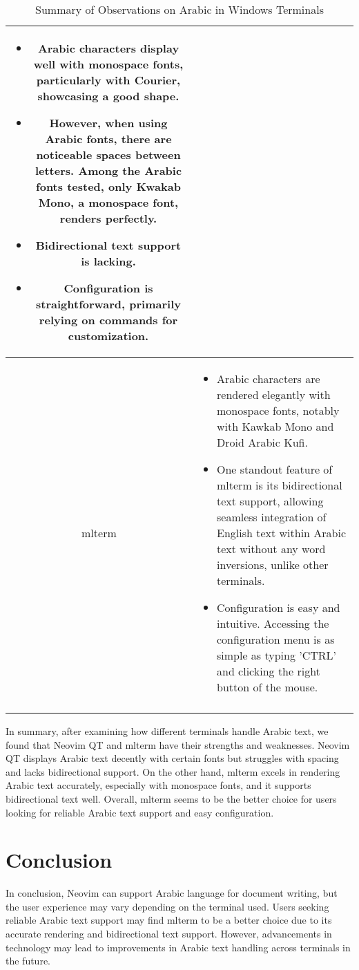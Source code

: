 \documentclass[12pt, letterpaper]{article}
\begin{document}
\begin{longtable}{|c|p{10cm}|}
    \begin{itemize}
        \item Arabic characters display well with monospace fonts, particularly with Courier, showcasing a good shape.
        \item However, when using Arabic fonts, there are noticeable spaces between letters. Among the Arabic fonts tested, only Kwakab Mono, a monospace font, renders perfectly.
        \item Bidirectional text support is lacking.
        \item Configuration is straightforward, primarily relying on commands for customization.
    \end{itemize}
    \\
    \hline
    mlterm &
    \begin{itemize}
        \item Arabic characters are rendered elegantly with monospace fonts, notably with Kawkab Mono and Droid Arabic Kufi.
        \item One standout feature of mlterm is its bidirectional text support, allowing seamless integration of English text within Arabic text without any word inversions, unlike other terminals.
        \item Configuration is easy and intuitive. Accessing the configuration menu is as simple as typing 'CTRL' and clicking the right button of the mouse.
    \end{itemize}
    \\
    \hline
    
    \caption{Summary of Observations on Arabic in Windows Terminals}
    \label{tab:observations}
\end{longtable}


In summary, after examining how different terminals handle Arabic text, we found that Neovim QT and mlterm have their strengths and weaknesses. Neovim QT displays Arabic text decently with certain fonts but struggles with spacing and lacks bidirectional support. On the other hand, mlterm excels in rendering Arabic text accurately, especially with monospace fonts, and it supports bidirectional text well. Overall, mlterm seems to be the better choice for users looking for reliable Arabic text support and easy configuration. 

\section{Conclusion}
In conclusion, Neovim can support Arabic language for document writing, but the user experience may vary depending on the terminal used. Users seeking reliable Arabic text support may find mlterm to be a better choice due to its accurate rendering and bidirectional text support. However, advancements in technology may lead to improvements in Arabic text handling across terminals in the future.
\end{document}
